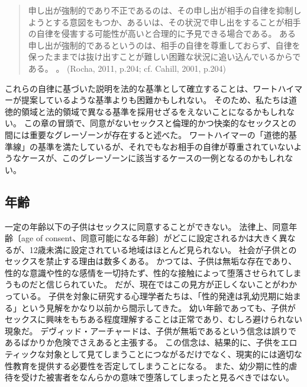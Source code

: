 \documentclass[paper=a4,book,openany]{jlreq}
\begin{document}
\begin{quote}
申し出が強制的であり不正であるのは、その申し出が相手の自律を抑制しようとする意図をもつか、あるいは、その状況で申し出をすることが相手の自律を侵害する可能性が高いと合理的に予見できる場合である。
ある申し出が強制的であるというのは、相手の自律を尊重しておらず、自律を保ったままでは抜け出すことが難しい困難な状況に追い込んでいるからである。\nocite{rocha11:_sexual_haras_coerc_offer} \nocite{cahill01:_rethin_rape}。
(Rocha, 2011, p.204; cf. Cahill, 2001, p.204)

\end{quote}

これらの自律に基づいた説明を法的な基準として確立することは、ワートハイマーが提案しているような基準よりも困難かもしれない。
そのため、私たちは道徳的領域と法的領域で異なる基準を採用せざるをえないことになるかもしれない。
この章の冒頭で、同意がないセックスと倫理的かつ快楽的なセックスとの間には重要なグレーゾーンが存在すると述べた。
ワートハイマーの「道徳的基準線」の基準を満たしているが、それでもなお相手の自律が尊重されていないようなケースが、このグレーゾーンに該当するケースの一例となるのかもしれない。

\subsection{年齢}

一定の年齢以下の子供はセックスに同意することができない。
法律上、同意年齢〔age of consent、同意可能になる年齢〕がどこに設定されるかは大きく異なるが、12歳未満に設定されている地域はほとんど見られない。
社会が子供とのセックスを禁止する理由は数多くある。
かつては、子供は無垢な存在であり、性的な意識や性的な感情を一切持たず、性的な接触によって堕落させられてしまうものだと信じられていた。
だが、現在ではこの見方が正しくないことがわかっている。
子供を対象に研究する心理学者たちは、「性的発達は乳幼児期に始まる」という見解をかなり以前から間示してきた\citep{louie19:_sexual_behav_child}。
幼い年齢であっても、子供がセックスに興味をもちある程度理解することは正常であり、むしろ避けられない現象だ。
デヴィッド・アーチャードは、子供が無垢であるという信念は誤りであるばかりか危険でさえあると主張する。
この信念は、結果的に、子供をエロティックな対象として見てしまうことにつながるだけでなく、現実的には適切な性教育を提供する必要性を否定してしまうことになる\citep[pp.118--119]{archard98:_sexual_consen}。
また、幼少期に性的虐待を受けた被害者をなんらかの意味で堕落してしまったと見るべきではない。
\end{document}
